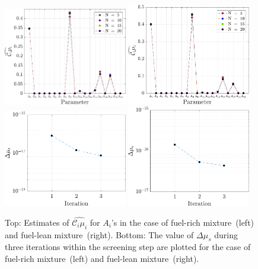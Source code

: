 \begin{figure}[htbp]
 \begin{center}
  \includegraphics[width=0.48\textwidth]{./Figures/ub_conv_kinetics_rich}
  \includegraphics[width=0.48\textwidth]{./Figures/ub_conv_kinetics_lean}
  \\ \vspace{2mm}
  \includegraphics[width=0.48\textwidth]{./Figures/mu_rich}
  \includegraphics[width=0.48\textwidth]{./Figures/mu_lean}
\caption{Top: Estimates of $\widehat{\mathcal{C}_i\mu_i}$ for $A_i$'s in the case
of fuel-rich mixture~(left) and fuel-lean mixture~(right). Bottom: The value of
$\Delta\mu_s$ during three iterations within the screening step are plotted for
the case of fuel-rich mixture~(left) and fuel-lean mixture~(right).}
\label{fig:sense_kinetics}
\end{center}
\end{figure}
